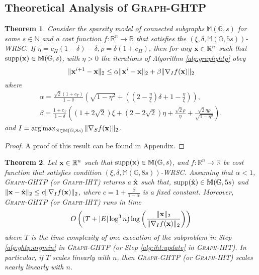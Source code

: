 \documentclass{article}
\DeclareMathOperator*{\argmax}{arg\,max}
\newtheorem{theorem}{Theorem}
\begin{document}
\subsection{Theoretical Analysis of \textsc{Graph}-GHTP}

\begin{theorem}\label{thm:ghtp:converge}
Consider the sparsity model of connected subgraphs $\mathbb{M}(\mathbb{G},s)$ for some $s\in\mathbb{N}$ and a cost function $f:\mathbb{R}^n\to\mathbb{R}$ that satisfies the $(\xi,\delta,\mathbb{M}(\mathbb{G},5s))$-WRSC. If $\eta=c_H(1-\delta)-\delta,\rho=\delta(1+c_H)$, then for any ${\bf x}\in\mathbb{R}^n$ such that $\mathrm{supp}({\bf x})\in\mathbb{M}(\mathbb{G},s)$, with $\eta>0$ the iterations of Algorithm \ref{alg:graphghtp} obey
\begin{equation}
\|{\bf x}^{i+1}-{\bf x}\|_2\leq\alpha\|{\bf x}^i-{\bf x}\|_2+\beta\|\nabla_I f({\bf x})\|_2
\end{equation}
where 
\begin{gather*}
\alpha=\frac{\sqrt{2}(1+c_T)}{1-\delta}\left(\sqrt{1-\eta^2}+\left((2-\frac{\eta}{\xi})\delta+1-\frac{\eta}{\xi} \right) \right),\\
\beta=\frac{1+c_T}{1-\delta}\left((1+2\sqrt{2})\xi+(2-2\sqrt{2})\eta+\frac{\sqrt{2}\rho}{\eta}+\frac{\sqrt{2}\eta\rho}{\sqrt{1-\eta^2}} \right),
\end{gather*}
and $I=\argmax_{S\in\mathbb{M}(\mathbb{G}, 8s)}\|\nabla_S f({\bf x})\|_2$.
\end{theorem}
\begin{proof}
A proof of this result can be found in Appendix.
\end{proof}

\begin{theorem}\label{thm:ghtp:iht:time}
Let ${\bf x}\in\mathbb{R}^n$ such that $\mathrm{supp}({\bf x})\in\mathbb{M}(\mathbb{G},s)$, and $f:\mathbb{R}^n\to\mathbb{R}$ be cost function that satisfies condition $(\xi,\delta,\mathbb{M}(\mathbb{G},8s))$-WRSC. Assuming that $\alpha<1$, \textsc{Graph}-GHTP (or \textsc{Graph}-IHT) returns a $\hat{\bf x}$ such that, $\mathrm{supp}(\hat{\bf x})\in\mathbb{M}(\mathbb{G},5s)$ and $\|{\bf x}-\hat{\bf x}\|_2\leq c\|\nabla_I f({\bf x})\|_2$, where $c=1+\frac{\beta}{1-\alpha}$ is a fixed constant. Moreover, \textsc{Graph}-GHTP (or \textsc{Graph}-IHT) runs in time
\begin{equation}
O\left((T+|E|\log^3 n)\log\left(\frac{\|{\bf x}\|_2}{\|\nabla_I f({\bf x})\|_2} \right) \right)
\end{equation}
where $T$ is the time complexity of one execution of the subproblem in Step \ref{alg:ghtp:argmin} in \textsc{Graph}-GHTP (or Step \ref{alg:iht:update} in \textsc{Graph}-IHT). In particular, if $T$ scales linearly with $n$, then \textsc{Graph}-GHTP (or \textsc{Graph}-IHT) scales nearly linearly with $n$.
\end{theorem}
\end{document}
